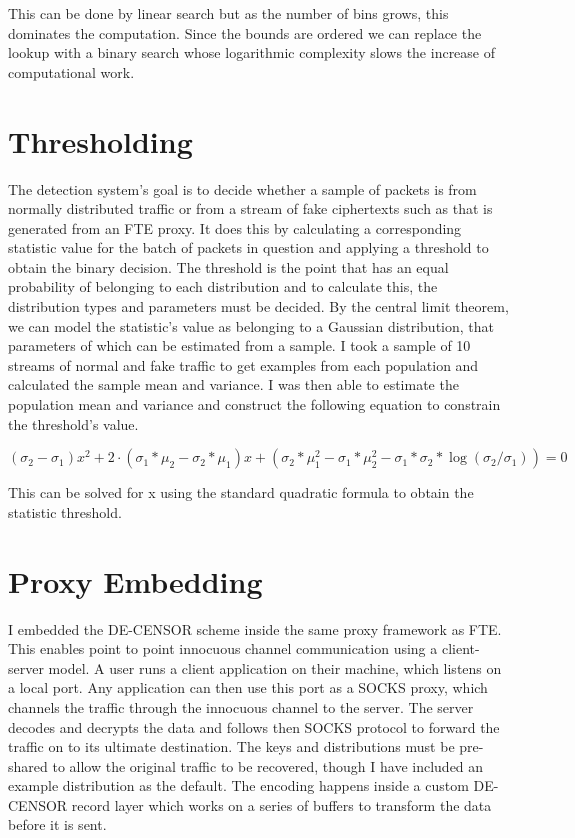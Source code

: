 \documentclass[ %
                    author={Samuel Russell},
                supervisor={Prof. Bogdan Warinschi},
                    degree={MEng},
                     title={Innocuous Ciphertexts},
                  subtitle={The DE-CENSOR Scheme},
                      type={Research},
                      year={2018} ]{dissertation}
\begin{document}
This can be done by linear search but as the number of bins grows, this dominates the computation.
Since the bounds are ordered we can replace the lookup with a binary search whose logarithmic complexity slows the increase of computational work.

\section{Thresholding}\label{sec:thresholding}

The detection system's goal is to decide whether a sample of packets is from normally distributed traffic or from a stream of fake ciphertexts such as that is generated from an FTE proxy.
It does this by calculating a corresponding statistic value for the batch of packets in question and applying a threshold to obtain the binary decision.
The threshold is the point that has an equal probability of belonging to each distribution and to calculate this, the distribution types and parameters must be decided.
By the central limit theorem, we can model the statistic's value as belonging to a Gaussian distribution, that parameters of which can be estimated from a sample.
I took a sample of 10 streams of normal and fake traffic to get examples from each population and calculated the sample mean and variance. I was then able to estimate the population mean and variance and construct the following equation to constrain the threshold's value.

$$(\sigma_2-\sigma_1) x^2 + 2\cdot (\sigma_1*\mu_2 - \sigma_2*\mu_1) x +  (\sigma_2*\mu_1^2 - \sigma_1*\mu_2^2 - \sigma_1*\sigma_2*\log(\sigma_2/\sigma_1)) = 0$$

This can be solved for x using the standard quadratic formula to obtain the statistic threshold.

\section{Proxy Embedding}

I embedded the DE-CENSOR scheme inside the same proxy framework as FTE.
This enables point to point innocuous channel communication using a client-server model.
A user runs a client application on their machine, which listens on a local port.
Any application can then use this port as a SOCKS proxy, which channels the traffic through the innocuous channel to the server.
The server decodes and decrypts the data and follows then SOCKS protocol to forward the traffic on to its ultimate destination.
The keys and distributions must be pre-shared to allow the original traffic to be recovered, though I have included an example distribution as the default.
The encoding happens inside a custom DE-CENSOR record layer which works on a series of buffers to transform the data before it is sent.
\end{document}
